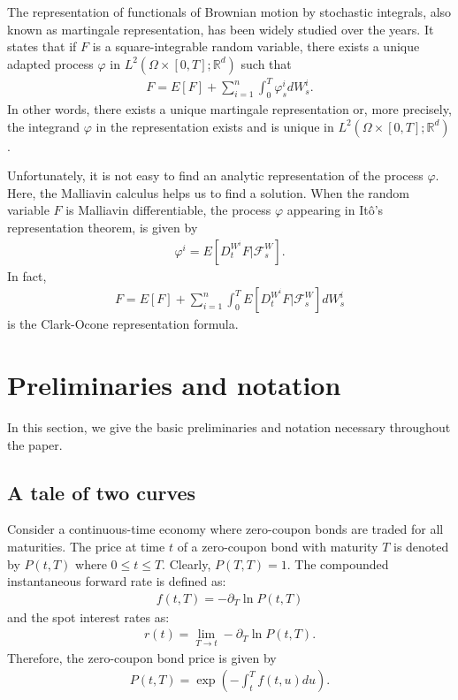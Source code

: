 \documentclass[a4paper,10pt]{article}
\newcommand{\1}{\mathbf{1}}
\begin{document}
\medbreak

The representation of functionals of Brownian motion by stochastic integrals, also known as martingale representation, has been widely studied over the years. It states that if $F$ is a square-integrable random variable, there exists a unique adapted process $\varphi$ in $L^{2}(\Omega \times \left[0,T\right]; \mathbb{R}^{d})$ such that
\begin{eqnarray*}
F=E\left[F\right] + \sum^{n}_{i=1}\int^{T}_{0} \varphi^{i}_{s} dW^{i}_{s}.
\end{eqnarray*}
In other words, there exists a unique martingale representation or, more precisely, the integrand $\varphi$ in the representation exists and is unique in $L^{2}(\Omega \times \left[0,T\right]; \mathbb{R}^{d})$.

\medbreak

Unfortunately, it is not easy to find an analytic representation of the process $\varphi$. Here, the Malliavin calculus helps us to find a solution. When the random variable $F$ is Malliavin differentiable, the process $\varphi$ appearing in It\^o's representation theorem, is given by
\begin{eqnarray*}
\varphi^{i}=E\left[D^{W^{i}}_{t}F|\mathcal{F}^{W}_{s}\right].
\end{eqnarray*}
In fact,
\begin{eqnarray}\label{clark-okone}
F=E\left[F\right] + \sum^{n}_{i=1}\int^{T}_{0} E\left[D^{W^{i}}_{t}F|\mathcal{F}^{W}_{s}\right] dW^{i}_{s}
\end{eqnarray}
is the Clark-Ocone representation formula. 



\section{Preliminaries and notation}\label{sec:Notation}
In this section, we give the basic preliminaries and notation necessary throughout the paper.
\subsection{A tale of two curves}
Consider a continuous-time economy where zero-coupon bonds are traded for all maturities. The price at time $t$ of a zero-coupon bond with maturity $T$ is denoted by $P(t,T)$ where $0\leq t \leq T$. Clearly, $P(T,T)=1$. The compounded instantaneous forward rate is defined as:
\begin{eqnarray*}
f(t,T)= -\partial_{T}\ln P(t,T)
\end{eqnarray*}
and the spot interest rates as:
\begin{eqnarray*}
r(t)=\lim_{T\longrightarrow t} -\partial_{T}\ln P(t,T).
\end{eqnarray*}
Therefore, the zero-coupon bond price is given by
\begin{eqnarray*}
P(t,T)=\exp\left(-\int^{T}_{t} f(t,u) du\right).
\end{eqnarray*}
\end{document}
